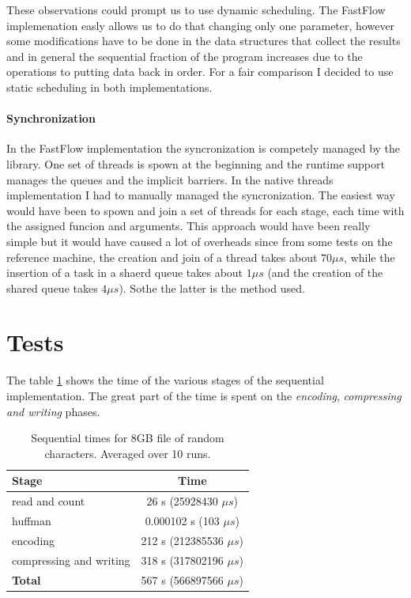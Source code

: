 \documentclass[12pt, letterpaper]{article}
\begin{document}
These observations could prompt us to use dynamic scheduling. The FastFlow implemenation easly allows us to do that changing only one parameter, however some modifications have to be done in the data structures that collect the results and in general the sequential fraction of the program increases due to the operations to putting data back in order. For a fair comparison I decided to use static scheduling in both implementations.

\paragraph*{Synchronization}
In the FastFlow implementation the syncronization is competely managed by the library. One set of threads is spown at the beginning and the runtime support manages the queues and the implicit barriers. In the native threads implementation I had to manually managed the syncronization. The easiest way would have been to spown and join a set of threads for each stage, each time with the assigned funcion and arguments. This approach would have been really simple but it would have caused a lot of overheads since from some tests on the reference machine, the creation and join of a thread takes about $70 \mu s$, while the insertion of a task in a shaerd queue takes about $1 \mu s$ (and the creation of the shared queue takes $4 \mu s$). Sothe the latter is the method used.




\section{Tests \label{sec:tests}}

The table \ref{tab:sequential_times} shows the time of the various stages of the sequential implementation. The great part of the time is spent on the \textit{encoding}, \textit{compressing and writing} phases.

\begin{table}[h]
\begin{center}
\begin{tabular}{l c}
    \textbf{Stage} & \textbf{Time}  \\
    \hline
    read and count & 26 s (25928430 $\mu s$) \\
    \hline
    huffman &  0.000102 s (103 $\mu s$) \\
    \hline
    encoding &  212 s  (212385536 $\mu s$) \\
    \hline
    compressing and writing & 318 s (317802196 $\mu s$) \\
    \hline
    \textbf{Total} & 567 s (566897566 $\mu s$) \\ 
\end{tabular}
\caption{Sequential times for 8GB file of random characters. Averaged over 10 runs.}
\label{tab:sequential_times}
\end{center}
\end{table}
\end{document}
